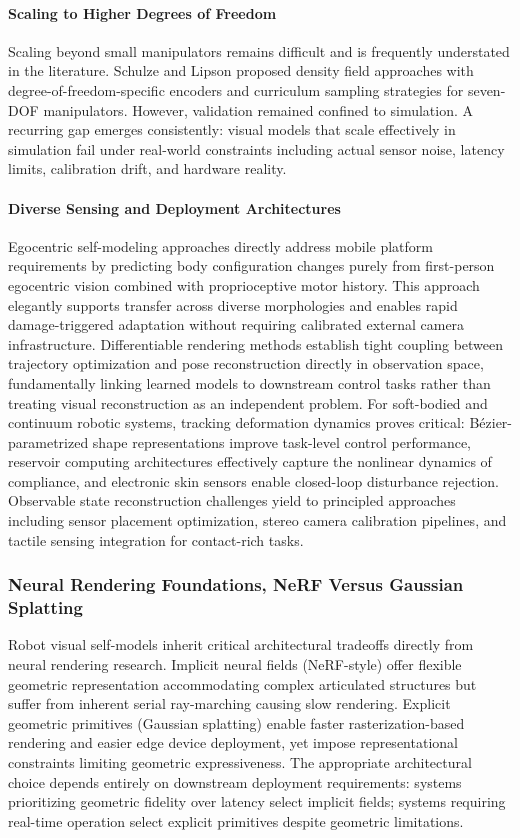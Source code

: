 ﻿\documentclass[11pt,a4paper]{article}
\begin{document}
\paragraph{Scaling to Higher Degrees of Freedom}
Scaling beyond small manipulators remains difficult and is frequently understated in the literature. Schulze and Lipson proposed density field approaches with degree-of-freedom-specific encoders and curriculum sampling strategies for seven-DOF manipulators. However, validation remained confined to simulation. A recurring gap emerges consistently: visual models that scale effectively in simulation fail under real-world constraints including actual sensor noise, latency limits, calibration drift, and hardware reality.

\paragraph{Diverse Sensing and Deployment Architectures}
Egocentric self-modeling approaches directly address mobile platform requirements by predicting body configuration changes purely from first-person egocentric vision combined with proprioceptive motor history. This approach elegantly supports transfer across diverse morphologies and enables rapid damage-triggered adaptation without requiring calibrated external camera infrastructure. Differentiable rendering methods establish tight coupling between trajectory optimization and pose reconstruction directly in observation space, fundamentally linking learned models to downstream control tasks rather than treating visual reconstruction as an independent problem. For soft-bodied and continuum robotic systems, tracking deformation dynamics proves critical: Bézier-parametrized shape representations improve task-level control performance, reservoir computing architectures effectively capture the nonlinear dynamics of compliance, and electronic skin sensors enable closed-loop disturbance rejection. Observable state reconstruction challenges yield to principled approaches including sensor placement optimization, stereo camera calibration pipelines, and tactile sensing integration for contact-rich tasks.

\subsubsection{Neural Rendering Foundations, NeRF Versus Gaussian Splatting}

Robot visual self-models inherit critical architectural tradeoffs directly from neural rendering research. Implicit neural fields (NeRF-style) offer flexible geometric representation accommodating complex articulated structures but suffer from inherent serial ray-marching causing slow rendering. Explicit geometric primitives (Gaussian splatting) enable faster rasterization-based rendering and easier edge device deployment, yet impose representational constraints limiting geometric expressiveness. The appropriate architectural choice depends entirely on downstream deployment requirements: systems prioritizing geometric fidelity over latency select implicit fields; systems requiring real-time operation select explicit primitives despite geometric limitations.
\end{document}
